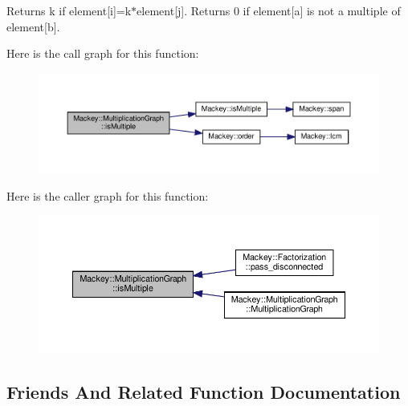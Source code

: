 Returns k if element\mbox{[}i\mbox{]}=k$\ast$element\mbox{[}j\mbox{]}. Returns 0 if element\mbox{[}a\mbox{]} is not a multiple of element\mbox{[}b\mbox{]}. 

Here is the call graph for this function\+:\nopagebreak
\begin{figure}[H]
\begin{center}
\leavevmode
\includegraphics[width=350pt]{classMackey_1_1MultiplicationGraph_a6ac7e92d6ceb6bc146f855898916449f_cgraph}
\end{center}
\end{figure}
Here is the caller graph for this function\+:\nopagebreak
\begin{figure}[H]
\begin{center}
\leavevmode
\includegraphics[width=350pt]{classMackey_1_1MultiplicationGraph_a6ac7e92d6ceb6bc146f855898916449f_icgraph}
\end{center}
\end{figure}


\subsection{Friends And Related Function Documentation}
\mbox{\label{classMackey_1_1MultiplicationGraph_a332842acf3d2d77031c64152ef5e08fc}} 
